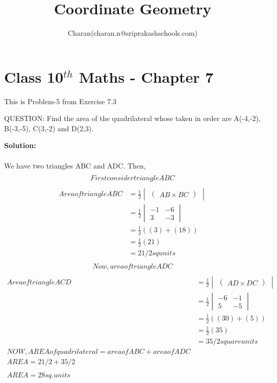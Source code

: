 \documentclass[12pt]{article}
\title{Coordinate Geometry}
\author{Charan(charan.n@sriprakashschools.com)}
\newcommand{\myvec}[1]{\ensuremath{\begin{pmatrix}#1\end{pmatrix}}}
\newcommand{\mydet}[1]{\ensuremath{\begin{vmatrix}#1\end{vmatrix}}}
\newcommand{\solution}{\noindent \textbf{Solution: }}
\begin{document}
\maketitle
\section*{Class 10$^{th}$ Maths - Chapter 7}
This is Problem-5 from Exercise 7.3
\item  QUESTION: Find the area of the quadrilateral whose taken in order are A(-4,-2), B(-3,-5), C(3,-2) and D(2,3).




\solution \\
\\We have two triangles ABC and ADC.
Then,
\begin{align}
\\First consider triangle ABC 

\end{align}
\begin{align}
\\Area of triangle ABC&=\frac{1}{2}\mydet{ \myvec {AB\times BC}}\\&=\frac{1}{2}\mydet{ {-1}&{-6}\\{3}&{-3}}\\ &=\frac{1}{2}\left((3)+(18)\right)\\&=\frac{1}{2}(21)\\&=21/2 sq units
\end{align}
\begin{align}
\\Now, area of triangle ADC
\end{align}
\begin{align}
\\Area of triangle ACD&=\frac{1}{2}\mydet{ \myvec {AD\times DC}}\\&=\frac{1}{2}\mydet{ {-6}&{-1} \\{5}&{-5}}\\ &=\frac{1}{2}\left((30)+(5)\right)\\&=\frac{1}{2}(35)\\&=35/2 square units
\\NOW,AREA of quadrilateral = area of ABC + area of ADC
\\AREA = 21/2 + 35/2\\
\\AREA = 28 sq.units
\end{align}
\end{document}
